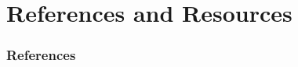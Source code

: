 \documentclass{beamer}
\begin{document}

\section{References and Resources}

\begin{frame}[allowframebreaks]
    \frametitle{References}
    \footnotesize{
        
        
    }
\end{frame}
\end{document}
